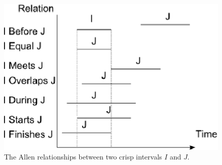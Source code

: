 



\begin{figure}[h]
   \centering
   \includegraphics[width=0.8\columnwidth]{graphs/allen.eps}
   \caption{The Allen relationships between two crisp intervals $I$ and $J$.  }
   \label{fig:allen-relationships}
 \end{figure}
